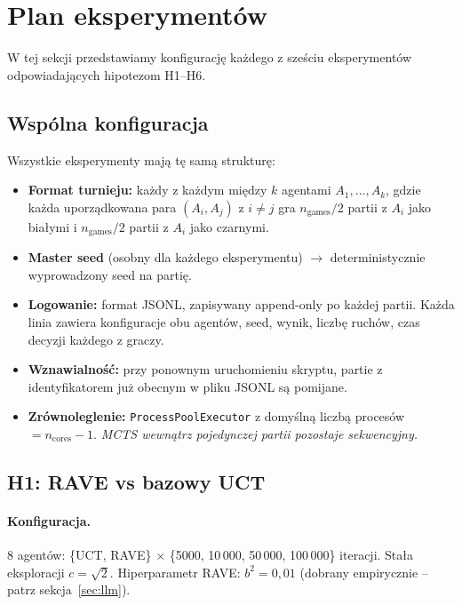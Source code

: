 \section{Plan eksperymentów}
\label{sec:eksperymenty}

W tej sekcji przedstawiamy konfigurację każdego z sześciu eksperymentów
odpowiadających hipotezom H1--H6.
\subsection{Wspólna konfiguracja}

Wszystkie eksperymenty mają tę samą strukturę:
\begin{itemize}[nosep]
    \item \textbf{Format turnieju:} każdy z każdym między $k$ agentami $A_1,
          \ldots, A_k$, gdzie każda uporządkowana para $(A_i, A_j)$ z $i \neq j$
          gra $n_{\text{games}}/2$ partii z $A_i$ jako białymi i $n_{\text{games}}/2$
          partii z $A_i$ jako czarnymi.
    \item \textbf{Master seed} (osobny dla każdego eksperymentu) $\to$ deterministycznie
          wyprowadzony seed na partię.
    \item \textbf{Logowanie:} format JSONL, zapisywany append-only po każdej partii. Każda linia zawiera konfiguracje obu agentów, seed, wynik,
          liczbę ruchów, czas decyzji każdego z graczy.
    \item \textbf{Wznawialność:} przy ponownym uruchomieniu skryptu, partie
          z identyfikatorem już obecnym w pliku JSONL są pomijane.
    \item \textbf{Zrównoleglenie:} \texttt{ProcessPoolExecutor} z domyślną liczbą procesów
          $= n_{\text{cores}} - 1$. \emph{MCTS wewnątrz pojedynczej partii pozostaje
          sekwencyjny.}
\end{itemize}

\subsection{H1: RAVE vs bazowy UCT}

\paragraph{Konfiguracja.}
8 agentów: \{UCT, RAVE\} $\times$ \{5000, 10\,000, 50\,000, 100\,000\} iteracji.
Stała eksploracji $c = \sqrt{2}$.
Hiperparametr RAVE: $b^2 = 0{,}01$ (dobrany empirycznie --
patrz sekcja~\ref{sec:llm}).

